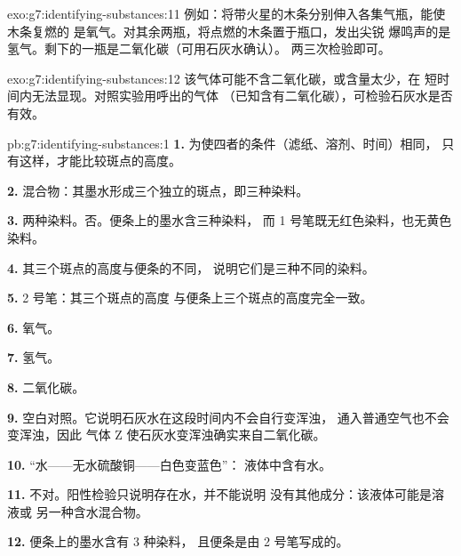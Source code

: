 \begin{solution}{exo:g7:identifying-substances:11}
例如：将带火星的木条分别伸入各集气瓶，能使木条复燃的
是氧气。对其余两瓶，将点燃的木条置于瓶口，发出尖锐
爆鸣声的是氢气。剩下的一瓶是二氧化碳（可用石灰水确认）。
两三次检验即可。
\end{solution}

\begin{solution}{exo:g7:identifying-substances:12}
该气体可能不含二氧化碳，或含量太少，在
短时间内无法显现。对照实验用呼出的气体
（已知含有二氧化碳），可检验石灰水是否有效。
\end{solution}

\begin{solution}{pb:g7:identifying-substances:1}
\textbf{1.} 为使四者的条件（滤纸、溶剂、时间）相同，
只有这样，才能比较斑点的高度。

\textbf{2.} 混合物：其墨水形成三个独立的斑点，即三种染料。

\textbf{3.} 两种染料。否。便条上的墨水含三种染料，
而 1 号笔既无红色染料，也无黄色染料。

\textbf{4.} 其三个斑点的高度与便条的不同，
说明它们是三种不同的染料。

\textbf{5.} 2 号笔：其三个斑点的高度
与便条上三个斑点的高度完全一致。

\textbf{6.} 氧气。

\textbf{7.} 氢气。

\textbf{8.} 二氧化碳。

\textbf{9.} 空白对照。它说明石灰水在这段时间内不会自行变浑浊，
通入普通空气也不会变浑浊，因此
气体 Z 使石灰水变浑浊确实来自二氧化碳。

\textbf{10.} “水——无水硫酸铜——白色变蓝色”：
液体中含有水。

\textbf{11.} 不对。阳性检验只说明存在水，并不能说明
没有其他成分：该液体可能是溶液或
另一种含水混合物。

\textbf{12.} 便条上的墨水含有 3 种染料，
且便条是由 2 号笔写成的。
\end{solution}
